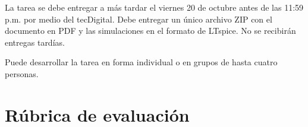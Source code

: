 \documentclass[11pt]{article}
\begin{document}
La tarea se debe entregar a más tardar el viernes 20 de octubre antes de las 11:59 p.m. por medio del tecDigital. Debe entregar un único archivo ZIP con el documento en PDF y las simulaciones en el formato de LTspice. No se recibirán entregas tardías.

Puede desarrollar la tarea en forma individual o en grupos de hasta cuatro personas.


\section{Rúbrica de evaluación}



\end{document}
